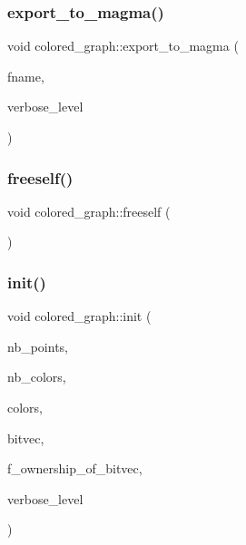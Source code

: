 \subsubsection{\texorpdfstring{export\+\_\+to\+\_\+magma()}{export\_to\_magma()}}
{\footnotesize\ttfamily void colored\+\_\+graph\+::export\+\_\+to\+\_\+magma (\begin{DoxyParamCaption}\item[{const \mbox{\hyperlink{galois_8h_ab6cc7b4aeb6ea31aba2b3fbfc83ff5e6}{B\+Y\+TE}} $\ast$}]{fname,  }\item[{\mbox{\hyperlink{galois_8h_a09fddde158a3a20bd2dcadb609de11dc}{I\+NT}}}]{verbose\+\_\+level }\end{DoxyParamCaption})}

\mbox{\label{classcolored__graph_a535b58df68ad6200bd6c8cde9bd09f57}} 
\subsubsection{\texorpdfstring{freeself()}{freeself()}}
{\footnotesize\ttfamily void colored\+\_\+graph\+::freeself (\begin{DoxyParamCaption}{ }\end{DoxyParamCaption})}

\mbox{\label{classcolored__graph_a4b917cdc9c6203a5a750c321e791bc7d}} 
\subsubsection{\texorpdfstring{init()}{init()}}
{\footnotesize\ttfamily void colored\+\_\+graph\+::init (\begin{DoxyParamCaption}\item[{\mbox{\hyperlink{galois_8h_a09fddde158a3a20bd2dcadb609de11dc}{I\+NT}}}]{nb\+\_\+points,  }\item[{\mbox{\hyperlink{galois_8h_a09fddde158a3a20bd2dcadb609de11dc}{I\+NT}}}]{nb\+\_\+colors,  }\item[{\mbox{\hyperlink{galois_8h_a09fddde158a3a20bd2dcadb609de11dc}{I\+NT}} $\ast$}]{colors,  }\item[{\mbox{\hyperlink{galois_8h_a122c4acf389c050379f00341fdcd5812}{U\+B\+Y\+TE}} $\ast$}]{bitvec,  }\item[{\mbox{\hyperlink{galois_8h_a09fddde158a3a20bd2dcadb609de11dc}{I\+NT}}}]{f\+\_\+ownership\+\_\+of\+\_\+bitvec,  }\item[{\mbox{\hyperlink{galois_8h_a09fddde158a3a20bd2dcadb609de11dc}{I\+NT}}}]{verbose\+\_\+level }\end{DoxyParamCaption})}

